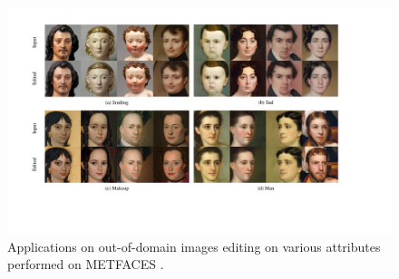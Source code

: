 \documentclass[letterpaper]{article} %
\begin{document}
\begin{figure}[t]
    \centering
    \includegraphics[width=1\textwidth]{Figs/fig17.pdf}
    \caption{Applications on out-of-domain images editing on various attributes performed on METFACES \cite{karras2020training}.}
    \label{fig18}
\end{figure}
\end{document}
